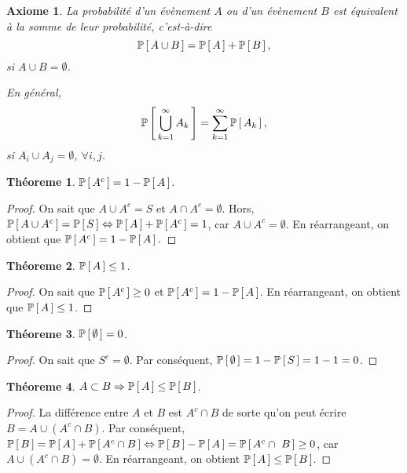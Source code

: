 \documentclass[11pt]{article}
\renewcommand\P[1]{%
	\ensuremath{%
		\mathbb{P}\left[\,#1\,\right]%
	}%
}%
\newtheorem{axiome}{Axiome}
\newtheorem{theoreme}{Théoreme}[section]
\theoremstyle{remark}
\theoremstyle{definition}
\begin{document}
\begin{axiome}
	La probabilité d'un évènement $A$ ou d'un évènement $B$ est équivalent à la
	somme de leur probabilité, c'est-à-dire
	\begin{equation*}
		\P{A\cup B}=\P{A}+\P{B},
	\end{equation*}
	si $A\cup B=\emptyset$.

	En général, 
	\begin{equation*}
		\P{\bigcup_{k=1}^\infty A_k}=\sum_{k=1}^\infty\P{A_k},
	\end{equation*}
	si $A_i\cup A_j=\emptyset$, $\forall i,j$.
\end{axiome}

\begin{theoreme}
	$\P{A^c}=1-\P{A}$.
\end{theoreme}

\begin{proof}
	On sait que $A\cup A^c=S$ et $A\cap A^c=\emptyset$. Hors,
	$\P{A\cup A^c}=\P{S}\Leftrightarrow\P{A}+\P{A^c}=1$, car
	$A\cup A^c=\emptyset$.
	En réarrangeant, on obtient que $\P{A^c}=1-\P{A}.$
\end{proof}

\begin{theoreme}
	$\P{A}\leq 1$.
\end{theoreme}

\begin{proof}
	On sait que $\P{A^c}\geq 0$ et $\P{A^c}=1-\P{A}$. En réarrangeant, on
	obtient que $\P{A}\leq 1$.
\end{proof}

\begin{theoreme}
	$\P{\emptyset}=0$.
\end{theoreme}

\begin{proof}
	On sait que $S^c=\emptyset$. Par conséquent, $\P{\emptyset}=1-\P{S}=1-1=0$.
\end{proof}

\begin{theoreme}
	$A\subset B\Rightarrow \P{A}\leq\P{B}$.
\end{theoreme}

\begin{proof}
	La différence entre $A$ et $B$ est $A^c\cap B$ de sorte qu'on peut écrire
	$B=A\cup(A^c\cap B)$. Par conséquent, $\P{B}=\P{A}+\P{A^c\cap B}
	\Leftrightarrow\P{B}-\P{A}=\P{A^c\cap B}\geq 0$, car
	$A\cup(A^c\cap B)=\emptyset$. En réarrangeant, on obtient $\P{A}\leq\P{B}$.
\end{proof}
\end{document}
